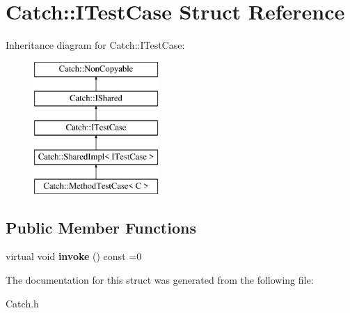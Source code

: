 \hypertarget{struct_catch_1_1_i_test_case}{\section{Catch\-:\-:I\-Test\-Case Struct Reference}
\label{struct_catch_1_1_i_test_case}
}
Inheritance diagram for Catch\-:\-:I\-Test\-Case\-:\begin{figure}[H]
\begin{center}
\leavevmode
\includegraphics[height=5.000000cm]{struct_catch_1_1_i_test_case}
\end{center}
\end{figure}
\subsection*{Public Member Functions}
\begin{DoxyCompactItemize}
\item 
\hypertarget{struct_catch_1_1_i_test_case_a678825e62e7c17297621cfeb65588c34}{virtual void {\bfseries invoke} () const =0}\label{struct_catch_1_1_i_test_case_a678825e62e7c17297621cfeb65588c34}

\end{DoxyCompactItemize}


The documentation for this struct was generated from the following file\-:\begin{DoxyCompactItemize}
\item 
Catch.\-h\end{DoxyCompactItemize}
